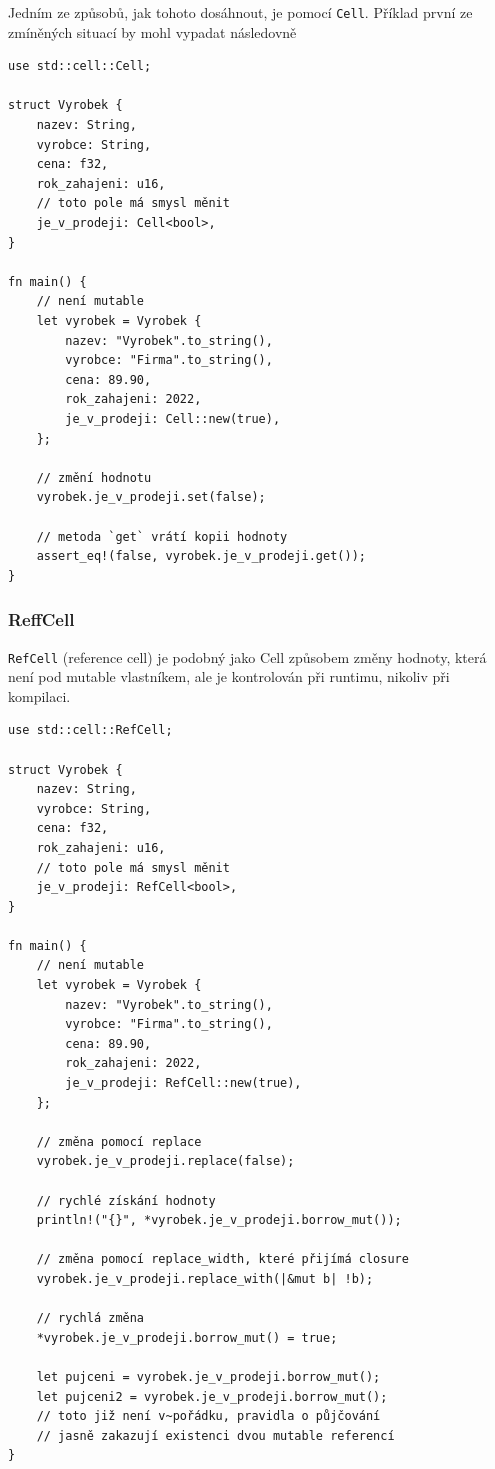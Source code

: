 \documentclass[a4paper, 12pt, twoside]{article} %
\newcommand{\rust}[1]{\texttt{#1}}
\begin{document}
			Jedním ze způsobů, jak tohoto dosáhnout, je pomocí \rust{Cell}. Příklad první ze zmíněných situací by mohl vypadat následovně
			\begin{verbatim}
use std::cell::Cell;

struct Vyrobek {
	nazev: String,
	vyrobce: String,
	cena: f32,
	rok_zahajeni: u16,
	// toto pole má smysl měnit
	je_v_prodeji: Cell<bool>,
}

fn main() {
	// není mutable
	let vyrobek = Vyrobek {
		nazev: "Vyrobek".to_string(),
		vyrobce: "Firma".to_string(),
		cena: 89.90,
		rok_zahajeni: 2022,
		je_v_prodeji: Cell::new(true),
	};

	// změní hodnotu
	vyrobek.je_v_prodeji.set(false);

	// metoda `get` vrátí kopii hodnoty
	assert_eq!(false, vyrobek.je_v_prodeji.get());
}
			\end{verbatim}
			\cite{cell}


		\subsubsection*{ReffCell}
			\rust{RefCell} (reference cell) je podobný jako Cell způsobem změny hodnoty, která není pod mutable vlastníkem, ale je kontrolován při runtimu, nikoliv při kompilaci. 
			\begin{verbatim}
use std::cell::RefCell;

struct Vyrobek {
	nazev: String,
	vyrobce: String,
	cena: f32,
	rok_zahajeni: u16,
	// toto pole má smysl měnit
	je_v_prodeji: RefCell<bool>,
}

fn main() {
	// není mutable
	let vyrobek = Vyrobek {
		nazev: "Vyrobek".to_string(),
		vyrobce: "Firma".to_string(),
		cena: 89.90,
		rok_zahajeni: 2022,
		je_v_prodeji: RefCell::new(true),
	};

	// změna pomocí replace
	vyrobek.je_v_prodeji.replace(false);

	// rychlé získání hodnoty
	println!("{}", *vyrobek.je_v_prodeji.borrow_mut());

	// změna pomocí replace_width, které přijímá closure
	vyrobek.je_v_prodeji.replace_with(|&mut b| !b);
	
	// rychlá změna
	*vyrobek.je_v_prodeji.borrow_mut() = true;
	
	let pujceni = vyrobek.je_v_prodeji.borrow_mut();
	let pujceni2 = vyrobek.je_v_prodeji.borrow_mut();
	// toto již není v~pořádku, pravidla o půjčování
	// jasně zakazují existenci dvou mutable referencí
}
			\end{verbatim}
			
\end{document}

